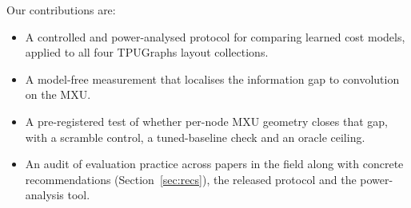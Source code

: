 Our contributions are:
\begin{itemize}
\item A controlled and power-analysed protocol for comparing learned cost models, applied to all four
  TPUGraphs layout collections.
\item A model-free measurement that localises the information gap to convolution on the MXU.
\item A pre-registered test of whether per-node MXU geometry closes that gap, with a scramble control, a
  tuned-baseline check and an oracle ceiling.
\item An audit of evaluation practice across papers in the field along with concrete recommendations
  (Section~\ref{sec:recs}), the released protocol and the power-analysis tool.
\end{itemize}
